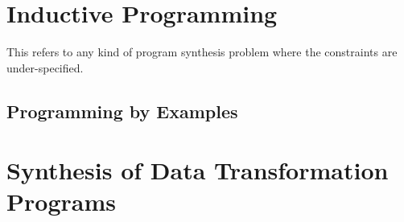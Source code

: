 

\section{Inductive Programming}
\label{sec:inductive-programming}

This refers to any kind of program synthesis problem where the constraints are
under-specified. 

\subsection{Programming by Examples}
\label{sec:pbe}

\section{Synthesis of Data Transformation Programs}
\label{sec:data-trans-synth}
